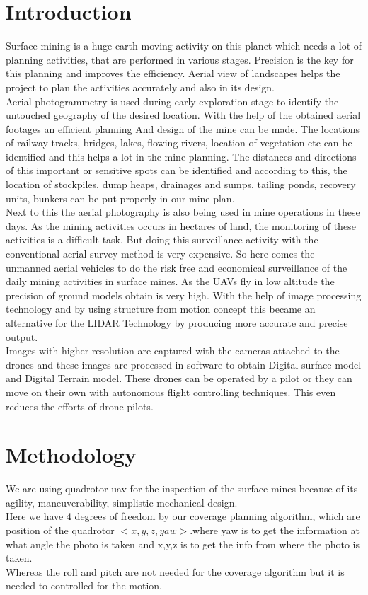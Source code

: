 \documentclass[conference]{IEEEtran}
\begin{document}
\section{Introduction}
Surface mining is a huge earth moving activity on this planet which needs a lot of planning activities, that are performed in various stages. Precision is the key for this planning and improves the efficiency. Aerial view of landscapes helps the project to plan the activities accurately and also in its design.\\
Aerial photogrammetry is used during early exploration stage to identify the untouched geography of the desired location. With the help of the obtained aerial footages an efficient planning And design of the mine can be made. The locations of railway tracks, bridges, lakes, flowing rivers,  location of vegetation etc can be identified and this helps a lot in the mine planning. The distances and directions of this important or sensitive spots can be identified and according to this, the location of stockpiles, dump heaps, drainages and sumps, tailing ponds, recovery units, bunkers can be put properly in our mine plan.\\
Next to this  the aerial photography is also being used in mine operations in these days.
As the mining activities occurs in hectares of land, the monitoring of these activities is a difficult task. But doing this surveillance activity with the conventional aerial survey method is very expensive. So here comes the unmanned aerial vehicles to do the risk free and economical surveillance of the daily mining activities in surface mines.  
As the  UAVs fly in low altitude the precision of ground models obtain is very high. With the help of image processing technology and by using structure from motion concept this became an alternative for the LIDAR Technology by producing more accurate and precise output.\\
Images with higher resolution are captured with the cameras attached to the drones and these images are processed in software to obtain Digital surface model and Digital Terrain model.
These drones can be operated by a pilot or they can move on their own with autonomous flight controlling techniques. This even reduces the efforts of drone pilots.\\
\section{Methodology}
We are using quadrotor uav for the inspection of the surface mines because of its agility, maneuverability, simplistic mechanical design.\\   
Here we have 4 degrees of freedom by our coverage planning algorithm, which are position of the quadrotor $<x, y, z, yaw>$.where yaw is to get the information at what angle the photo is taken and x,y,z is to get the info from where the photo is taken.\\
Whereas the roll and pitch  are not needed for the coverage algorithm but it is needed to controlled for the motion.\\
\end{document}

